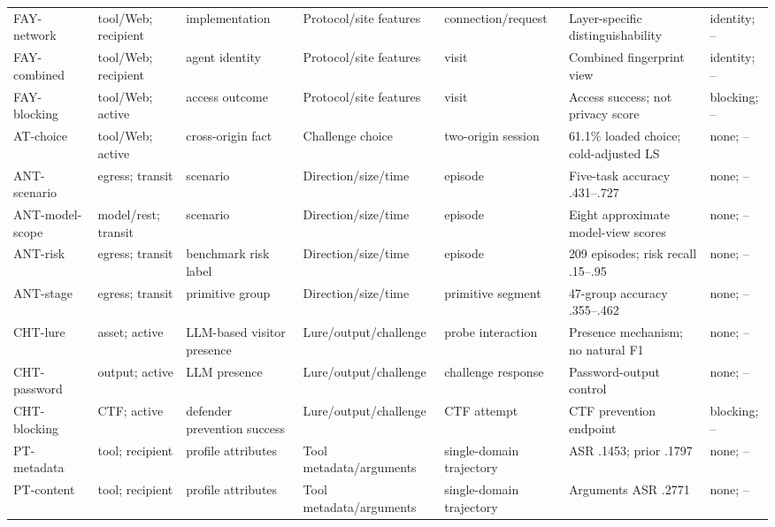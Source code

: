 \begin{table}[t]
\begin{tabularx}{\textwidth}{@{}P{.14\textwidth}P{.11\textwidth}P{.13\textwidth}P{.14\textwidth}P{.12\textwidth}Y P{.09\textwidth}@{}}
FAY-network~\cite{fayolle2026webagents} & tool/Web; recipient & implementation & Protocol/site features & connection/request & Layer-specific distinguishability & identity; -- \\
FAY-combined~\cite{fayolle2026webagents} & tool/Web; recipient & agent identity & Protocol/site features & visit & Combined fingerprint view & identity; -- \\
FAY-blocking~\cite{fayolle2026webagents} & tool/Web; active & access outcome & Protocol/site features & visit & Access success; not privacy score & blocking; -- \\
AT-choice~\cite{shahriar2026agenttell} & tool/Web; active & cross-origin fact & Challenge choice & two-origin session & 61.1\% loaded choice; cold-adjusted LS & none; -- \\
ANT-scenario~\cite{li2026ant} & egress; transit & scenario & Direction/size/time & episode & Five-task accuracy .431--.727 & none; -- \\
ANT-model-scope~\cite{li2026ant} & model/rest; transit & scenario & Direction/size/time & episode & Eight approximate model-view scores & none; -- \\
ANT-risk~\cite{li2026ant} & egress; transit & benchmark risk label & Direction/size/time & episode & 209 episodes; risk recall .15--.95 & none; -- \\
ANT-stage~\cite{li2026ant} & egress; transit & primitive group & Direction/size/time & primitive segment & 47-group accuracy .355--.462 & none; -- \\
CHT-lure~\cite{ayzenshteyn2025cheat} & asset; active & LLM-based visitor presence & Lure/output/challenge & probe interaction & Presence mechanism; no natural F1 & none; -- \\
CHT-password~\cite{ayzenshteyn2025cheat} & output; active & LLM presence & Lure/output/challenge & challenge response & Password-output control & none; -- \\
CHT-blocking~\cite{ayzenshteyn2025cheat} & CTF; active & defender prevention success & Lure/output/challenge & CTF attempt & CTF prevention endpoint & blocking; -- \\
PT-metadata~\cite{duan2026privacytrace} & tool; recipient & profile attributes & Tool metadata/arguments & single-domain trajectory & ASR .1453; prior .1797 & none; -- \\
PT-content~\cite{duan2026privacytrace} & tool; recipient & profile attributes & Tool metadata/arguments & single-domain trajectory & Arguments ASR .2771 & none; -- \\

\end{tabularx}
\end{table}
